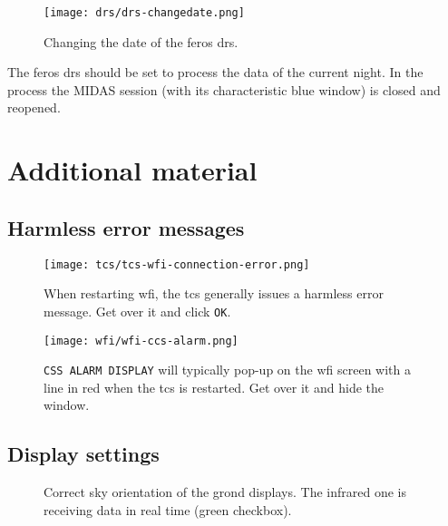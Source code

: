 \documentclass[11pt,fleqn]{book} %
\begin{document}
\begin{figure}[ht!]
\centering
\texttt{[image: drs/drs-changedate.png]}
\caption{Changing the date of the \gls{feros} \gls{drs}.}
\label{fig:drsswitch}
\end{figure}
The \gls{feros} \gls{drs} should be set to process the data of the 
current night.  In the process the MIDAS session (with its characteristic
blue window) is closed and reopened.  

\section{Additional material}
\subsection{Harmless error messages}
\begin{figure}[ht!]
\centering
\texttt{[image: tcs/tcs-wfi-connection-error.png]}
\caption[Harmless error message of the TCS during WFI restart]{When restarting \gls{wfi}, the \gls{tcs} generally issues a harmless
error message.  Get over it and click \texttt{OK}.}
\label{fig:wfistarterror}
\end{figure}

\begin{figure}[ht!]
\centering
\texttt{[image: wfi/wfi-ccs-alarm.png]}
\caption[Harmless alarm display on WFI during TCS restart]{\texttt{CSS ALARM DISPLAY} will typically pop-up on the \gls{wfi}
screen with a line in red when the \gls{tcs} is restarted.  Get over it and
hide the window.}
\label{fig:wfialarm}
\end{figure}

\subsection{Display settings}
\begin{figure}[ht!]
\null\hfil
{}%
\hfil
{}
\hfil\null
\caption[Correct sky orientation of the GROND displays]{Correct sky orientation of the \gls{grond} displays. The infrared one
is receiving data in real time (green checkbox).}
\end{figure}

\end{document}
